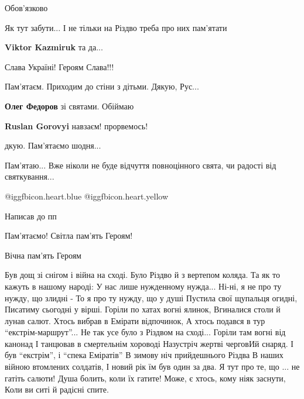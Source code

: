  
 
 
 
 
\zzSecCmt

\begin{itemize} %
Обов’язково

Як тут забути...
І не тільки на Різдво треба про них пам'ятати

\textbf{Viktor Kazmiruk} та да...

Слава Україні! Героям Слава!!!

Пам'ятаєм.
Приходим до стіни з дітьми. Дякую, Рус...

\textbf{Олег Федоров} зі святами. Обіймаю

\textbf{Ruslan Gorovyi} навзаєм! прорвемось!

дкую. Пам'ятаємо шодня...

Пам'ятаю... Вже ніколи не буде відчуття повноцінного свята, чи радості від святкування...

 @igg{fbicon.heart.blue}  @igg{fbicon.heart.yellow} 

Написав до пп

Пам'ятаємо! Світла пам'ять Героям!

Вічна пам'ять Героям


\begin{multicols}{2}
\obeycr
Був дощ зі снігом і війна на сході.
Було Різдво й з вертепом коляда.
Та як то кажуть в нашому народі:
У нас лише нужденному нужда...
\smallskip
Ні-ні, я не про ту нужду, що злидні -
То я про ту нужду, що у душі
Пустила свої щупальця огидні,
Писатиму сьогодні у вірші.
\smallskip
Горіли по хатах вогні ялинок,
Вгиналися столи й лунав салют.
Хтось вибрав в Емірати відпочинок,
А хтось подався в тур \enquote{екстрім-маршрут}...
\smallskip
Не так усе було з Різдвом на сході...
Горіли там вогні від канонад
І танцював в смертельнім хороводі
Назустріч жертві черговИй снаряд.
\smallskip
І був \enquote{екстрім}, і \enquote{спека Еміратів}
В зимову ніч прийдешнього Різдва
В наших війною втомлених солдатів,
І новий рік їм був один за два.
\smallskip
Я тут про те, що ... не гатіть салюти!
Душа болить, коли їх гатите!
Може, є хтось, кому ніяк заснути,
Коли ви ситі й радісні спите.
\restorecr
\end{multicols}


\end{itemize}
